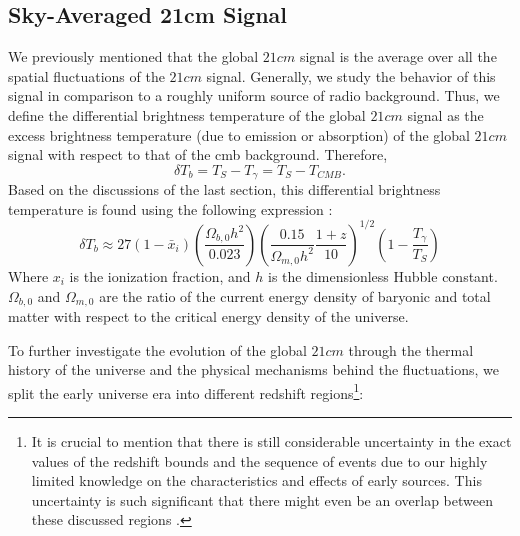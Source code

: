 \documentclass[12pt, TexShade, letterpaper]{report}
\begin{document}
\subsection{Sky-Averaged 21cm Signal}
\label{chap:global21cm,sub:physics,sub:global}
We previously mentioned that the global $21cm$ signal is the average over all the spatial fluctuations of the $21cm$ signal. Generally, we study the behavior of this signal in comparison to a roughly uniform source of radio background. Thus, we define the differential brightness temperature of the global $21cm$ signal as the excess brightness temperature (due to emission or absorption) of the global $21cm$ signal with respect to that of the \gls{cmb} background. Therefore,
\begin{equation}
    \delta T_b = T_{S} - T_{\gamma} = T_S - T_{CMB}.
\end{equation}
Based on the discussions of the last section, this differential brightness temperature is found using the following expression \cite{low_frequency}:
\begin{equation}
    \delta T_b \approx 27 \left(1- \bar{x}_i\right) \left(\frac{\Omega_{b, 0}h^2}{0.023}\right) \left( \frac{0.15}{\Omega_{m, 0}h^2} \frac{1+z}{10}\right)^{1/2}\left(1-\frac{T_\gamma}{T_S}\right)
    \label{eq:global_curve}
\end{equation}
Where $x_i$ is the ionization fraction, and $h$ is the dimensionless Hubble constant. $\Omega_{b, 0}$ and $\Omega_{m, 0}$ are the ratio of the current energy density of baryonic and total matter with respect to the critical energy density of the universe.\par
To further investigate the evolution of the global $21cm$ through the thermal history of the universe and the physical mechanisms behind the fluctuations, we split the early universe era into different redshift regions\footnote{It is crucial to mention that there is still considerable uncertainty in the exact values of the redshift bounds and the sequence of events due to our highly limited knowledge on the characteristics and effects of early sources. This uncertainty is such significant that there might even be an overlap between these discussed regions \cite{21century}.}:\par
\end{document}
